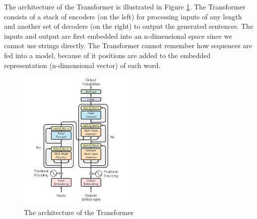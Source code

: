 The architecture of the Transformer is illustrated in Figure \ref{transformer}. The Transformer consists of a stack of encoders (on the left) for processing inputs of any length and another set of decoders (on the right) to output the generated sentences. The inputs and output are first embedded into an n-dimensional space since we cannot use strings directly. The Transformer cannot remember how sequences are fed into a model, because of it positions are added to the embedded representation (n-dimensional vector) of each word.

\begin{figure}[hbt]
  \centering
  \includegraphics[width=0.5\textwidth]{figures/transformer.png}
  \caption{The architecture of the Transformer\cite{transformer}}
  \label{transformer}
\end{figure}

